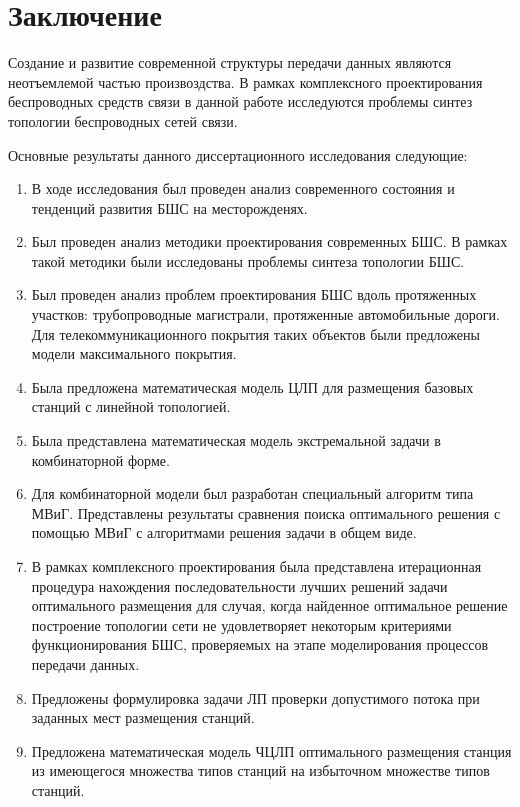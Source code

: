 \chapter*{Заключение}                       %
Создание и развитие современной структуры передачи данных являются неотъемлемой частью произвоздства. В рамках комплексного проектирования беспроводных средств связи в данной работе исследуются проблемы синтез топологии беспроводных сетей связи.

Основные результаты данного диссертационного исследования следующие:
\begin{enumerate}
    \item В ходе исследования был проведен анализ современного состояния и тенденций развития БШС на месторожденях.
    \item Был проведен анализ методики проектирования современных БШС. В рамках такой методики были исследованы проблемы синтеза топологии БШС.
    \item Был проведен анализ проблем проектирования БШС вдоль протяженных участков: трубопроводные магистрали, протяженные автомобильные дороги. Для телекоммуникационного покрытия таких объектов были предложены модели максимального покрытия.
    \item Была предложена математическая модель ЦЛП для размещения базовых станций с линейной топологией.
    \item Была представлена математическая модель экстремальной задачи в комбинаторной форме. 
    \item Для комбинаторной модели был разработан специальный алгоритм типа МВиГ. Представлены результаты сравнения поиска оптимального решения с помощью МВиГ с алгоритмами решения задачи в общем виде.
    \item В рамках комплексного проектирования была представлена итерационная процедура нахождения последовательности лучших решений задачи оптимального размещения для случая, когда найденное оптимальное решение построение топологии сети не удовлетворяет некоторым критериями функционирования БШС, проверяемых на этапе моделирования процессов передачи данных.
    \item Предложены формулировка задачи ЛП проверки допустимого потока при заданных мест размещения станций.
    \item Предложена математическая модель ЧЦЛП оптимального размещения станция из имеющегося множества типов станций на избыточном множестве типов станций.
\end{enumerate}


